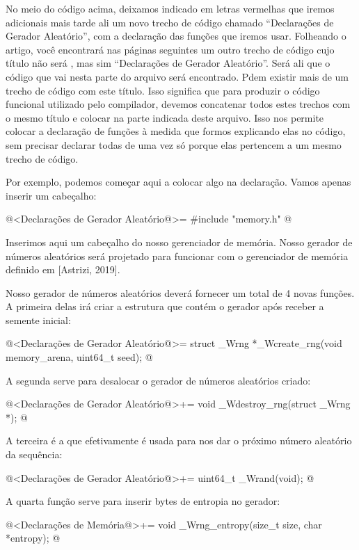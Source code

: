No meio do código acima, deixamos indicado em letras vermelhas que
iremos adicionais mais tarde ali um novo trecho de código chamado
``Declarações de Gerador Aleatório'', com a declaração das funções que
iremos usar. Folheando o artigo, você encontrará nas páginas seguintes
um outro trecho de código cujo título não será ,
mas sim ``Declarações de Gerador Aleatório''. Será ali que o código que
vai nesta parte do arquivo será encontrado. Pdem existir mais de um
trecho de código com este título. Isso significa que para produzir o
código funcional utilizado pelo compilador, devemos concatenar todos
estes trechos com o mesmo título e colocar na parte indicada deste
arquivo. Isso nos permite colocar a declaração de funções à medida que
formos explicando elas no código, sem precisar declarar todas de uma
vez só porque elas pertencem a um mesmo trecho de código.

Por exemplo, podemos começar aqui a colocar algo na declaração. Vamos
apenas inserir um cabeçalho:

\iniciocodigo
@<Declarações de Gerador Aleatório@>=
#include "memory.h"
@
\fimcodigo

Inserimos aqui um cabeçalho do nosso gerenciador de memória. Nosso
gerador de números aleatórios será projetado para funcionar com o
gerenciador de memória definido em [Astrizi, 2019].


Nosso gerador de números aleatórios deverá fornecer um total de 4
novas funções. A primeira delas irá criar a estrutura que contém o
gerador após receber a semente inicial:

\iniciocodigo
@<Declarações de Gerador Aleatório@>=
struct _Wrng *_Wcreate_rng(void memory_arena, uint64_t seed);
@
\fimcodigo

A segunda serve para desalocar o gerador de números aleatórios criado:

\iniciocodigo
@<Declarações de Gerador Aleatório@>+=
void _Wdestroy_rng(struct _Wrng *);
@
\fimcodigo

A terceira é a que efetivamente é usada para nos dar o próximo número
aleatório da sequência:

\iniciocodigo
@<Declarações de Gerador Aleatório@>+=
uint64_t _Wrand(void);
@
\fimcodigo

A quarta função serve para inserir bytes de entropia no gerador:

\iniciocodigo
@<Declarações de Memória@>+=
void _Wrng_entropy(size_t size, char *entropy);
@
\fimcodigo

